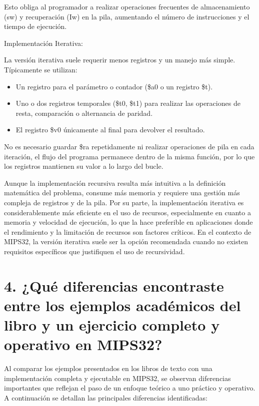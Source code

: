 \documentclass[12pt, letterpaper]{article}
\begin{document}
Esto obliga al programador a realizar operaciones frecuentes de almacenamiento (sw) y recuperación (Iw) en la pila, aumentando el número de instrucciones y el tiempo de ejecución.

Implementación Iterativa:

La versión iterativa suele requerir menos registros y un manejo más simple. Típicamente se utilizan:

\begin{itemize}
    \item Un registro para el parámetro o contador (\$a0 o un registro \$t).
    \item Uno o dos registros temporales (\$t0, \$t1) para realizar las operaciones de resta, comparación o alternancia de paridad.
    \item El registro \$v0 únicamente al final para devolver el resultado.
\end{itemize}

No es necesario guardar \$ra repetidamente ni realizar operaciones de pila en cada iteración, el flujo del programa permanece dentro de la misma función, por lo que los registros mantienen su valor a lo largo del bucle.

Aunque la implementación recursiva resulta más intuitiva a la definición matemática del problema, consume más memoria y requiere una gestión más compleja de registros y de la pila. Por su parte, la implementación iterativa es considerablemente más eficiente en el uso de recursos, especialmente en cuanto a memoria y velocidad de ejecución, lo que la hace preferible en aplicaciones donde el rendimiento y la limitación de recursos son factores críticos. En el contexto de MIPS32, la versión iterativa suele ser la opción recomendada cuando no existen requisitos específicos que justifiquen el uso de recursividad.

\newpage
\section*{4. ¿Qué diferencias encontraste entre los ejemplos académicos del libro y un ejercicio completo y operativo en MIPS32?}

Al comparar los ejemplos presentados en los libros de texto con una implementación completa y ejecutable en MIPS32, se observan diferencias importantes que reflejan el paso de un enfoque teórico a uno práctico y operativo. A continuación se detallan las principales diferencias identificadas:
\end{document}
